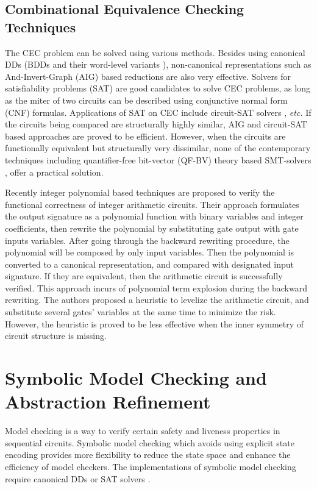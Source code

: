 \subsection{Combinational Equivalence Checking Techniques}
The CEC problem can be solved using various methods.
Besides using canonical DDs (BDDs
\cite{BRYA86} and their word-level variants \cite{WLS}),
non-canonical representations such as And-Invert-Graph (AIG) based reductions 
\cite{AIG:2002,alanmi:cec:iccad2006} are also very effective. 
Solvers for satisfiability problems (SAT) are good candidates to solve CEC problems,
as long as the miter of two circuits can be described using conjunctive normal form (CNF)
formulas. Applications of SAT on CEC include circuit-SAT solvers \cite{csat}, {\it etc.}
If the circuits being compared are structurally highly similar, AIG and circuit-SAT 
based approaches are proved to be efficient.
However, when the circuits are functionally equivalent but structurally very dissimilar, none of the 
  contemporary techniques including quantifier-free bit-vector 
  (QF-BV) theory based SMT-solvers \cite{Cryptol:fmcad09},
  offer a practical solution.    


Recently integer polynomial based techniques \cite{ciesielski2014function,rolf:date16} are proposed  to verify the functional 
correctness of integer arithmetic circuits. Their approach formulates the output signature as a polynomial function 
with binary variables and integer coefficients, then rewrite the polynomial by substituting gate output with gate inputs
variables. After going through the backward rewriting procedure,  the polynomial
will be composed by only input variables. Then the polynomial is converted to a canonical representation, and compared
with designated input signature. If they are equivalent, then the arithmetic circuit is successfully verified.
This approach incurs of polynomial term explosion during the backward rewriting. The authors proposed a heuristic
to levelize the arithmetic circuit, and substitute several gates' variables at the same time to minimize the risk. However, 
the heuristic is proved to be less effective when the inner symmetry of circuit structure is missing.

  
\section{Symbolic Model Checking and Abstraction Refinement}
Model checking is a way to verify certain safety and liveness properties 
in sequential circuits. Symbolic model checking which avoids using explicit state encoding
provides more flexibility to reduce the state space and enhance the 
efficiency of model checkers. The implementations of symbolic model checking 
require canonical DDs or SAT solvers \cite{burch1990sequential,burch1991representing,biere1999symbolic}.

